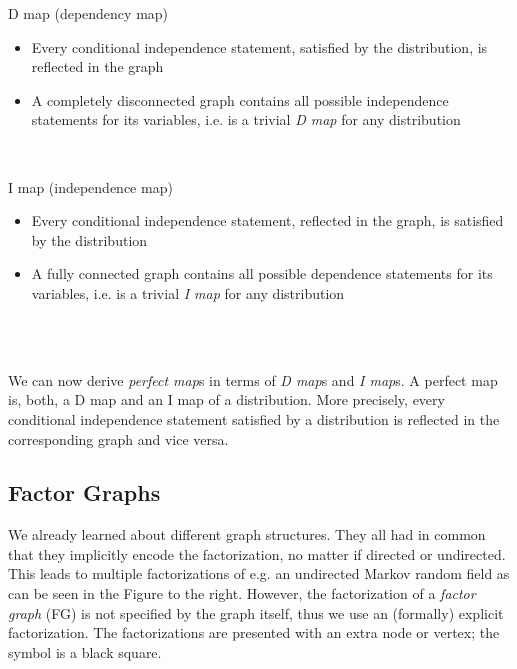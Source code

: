 \begin{minipage}[t]{1\textwidth}
	\begin{minipage}[t]{.48\textwidth}
		\centerline{\Large{}D map (dependency map)}
		\vspace*{5pt}
		\begin{itemize}
			\item Every conditional independence statement, satisfied by the distribution, is reflected in the graph
			\item A completely disconnected graph contains all possible independence statements for its variables, i.e. is a trivial \emph{D map} for any distribution
		\end{itemize}
		~\\%
	\end{minipage}
	\hfill
	\vrule
	\hfill
	\begin{minipage}[t]{.48\textwidth}
		\centerline{\Large{}I map (independence map)}
		\vspace*{5pt}
		\begin{itemize}
			\item Every conditional independence statement, reflected in the graph, is satisfied by the distribution
			\item A fully connected graph contains all possible dependence statements for its variables, i.e. is a trivial \emph{I map} for any distribution
		\end{itemize}
		~\\%
	\end{minipage}
\end{minipage}
~\\[.3cm]
We can now derive \emph{perfect map}s in terms of \emph{D map}s and \emph{I map}s. %
A perfect map is, both, a D map and an I map of a distribution. %
More precisely, every conditional independence statement satisfied by a distribution is reflected in the corresponding graph and vice versa. %
%
%
%
\subsection{Factor Graphs}
\begin{minipage}[t]{.96\textwidth}
	\begin{minipage}[t]{.68\textwidth}
		We already learned about different graph structures. %
		They all had in common that they implicitly encode the factorization, no matter if directed or undirected. %
		This leads to multiple factorizations of e.g. an undirected Markov random field as can be seen in the Figure to the right. %
		However, the factorization of a \emph{factor graph} (FG) is not specified by the graph itself, thus we use an (formally) explicit factorization. %
		The factorizations are presented with an extra node or vertex; the symbol is a black square. %
	\end{minipage}
	\hfill
	\begin{minipage}[t]{.28\textwidth}
		\begin{figure}[H]
			\centering{}
		\end{figure}
	\end{minipage}
\end{minipage}
\\[.1cm]%
